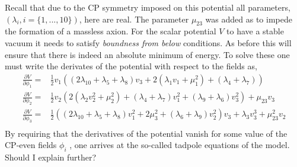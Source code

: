 Recall that due to the CP symmetry imposed on this potential all parameters, $(\lambda_i,i=\{1,...,10\})$, here are real.
%
The parameter $\mu_{23}$ was added as to impede the formation of a massless axion. 
% 
For the scalar potential $V$ to have a stable vacuum it needs to satisfy \textit{boundness from below} conditions. 
%
As before this will ensure that there is indeed an absolute minimum of energy. 
%
To solve these one must write the derivates of the potential with respect to the fields as,
%
\begin{equation}
\label{eq:3HDM_tadpoles}
\begin{split}
\frac{\partial V}{\partial \phi_1} = & \frac{1}{2} v_1 \left( \left( 2 \lambda_{10} + \lambda_5 + \lambda_8 \right) v_3 + 2 \left( \lambda_1 v_1 + \mu_1^2 \right) + \left( \lambda_4 + \lambda_7 \right)  \right)  \\ 
\frac{\partial V}{\partial \phi_2} = & \frac{1}{2} v_2 \left( 2\left( \lambda_2 v_2^2 + \mu_2^2 \right) + \left( \lambda_4 + \lambda_7 \right) v_1^2 + \left( \lambda_9 + \lambda_6 \right)v_3^2 \right) + \mu_{23} v_3 \\
\frac{\partial V}{\partial \phi_3} = & \frac{1}{2} \left( \left( 2 \lambda_{10} + \lambda_5 + \lambda_8  \right) v_1^2  + 2 \mu_3^2 + \left( \lambda_6 + \lambda_9 \right) v_2^2 \right) v_3 + \lambda_3 v_3^3 + \mu_{23}^2 v_2 \\
\end{split} 
\end{equation}
%
By requiring that the derivatives of the potential vanish for some value of the CP-even fields $\phi_i$ , one arrives at the so-called tadpole equations of the model.
%
{\color{red} Should I explain further?} 

